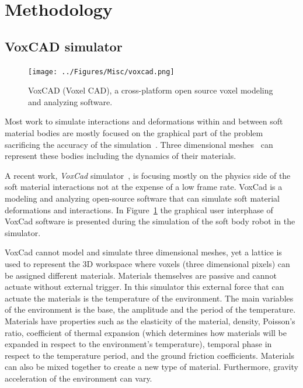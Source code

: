 \documentclass{sig-alternate}
\begin{document}
\section{Methodology}
\subsection{VoxCAD simulator}

\begin{figure}[t!]
\centering
\texttt{[image: ../Figures/Misc/voxcad.png]}
\caption{VoxCAD (Voxel CAD), a cross-platform open source voxel modeling and analyzing software.}
\label{fig:VoxCAD}
\end{figure}


Most work to simulate interactions and deformations within and between soft material bodies are mostly focused on the graphical part of the problem~\cite{faloutsos1997dynamic} sacrificing the accuracy of the simulation~\cite{teschner2004versatile}. Three dimensional meshes~\cite{muller2002stable} can represent these bodies including the dynamics of their materials. 

A recent work, \emph{VoxCad} simulator~\cite{hiller2012dynamic}, is focusing mostly on the physics side of the soft material interactions not at the expense of a low frame rate. VoxCad is a modeling and analyzing open-source software that can simulate soft material deformations and interactions. In Figure~\ref{fig:VoxCAD} the graphical user interphase of VoxCad software is presented during the simulation of the soft body robot in the simulator.

VoxCad cannot model and simulate three dimensional meshes, yet a lattice is used to represent the 3D workspace where voxels (three dimensional pixels) can be assigned different materials. Materials themselves are passive and cannot actuate without external trigger. In this simulator this external force that can actuate the materials is the temperature of the environment. The main variables of the environment is the base, the amplitude and the period of the temperature. Materials have properties such as the elasticity of the material, density, Poisson's ratio, coefficient of thermal expansion (which determines how materials will be expanded in respect to the environment's temperature), temporal phase in respect to the temperature period, and the ground friction coefficients. Materials can also be mixed together to create a new type of material. Furthermore, gravity acceleration of the environment can vary.
\end{document}
